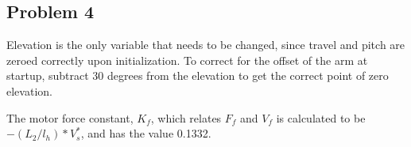 \subsection{Problem 4}
Elevation is the only variable that needs to be changed, since travel
and pitch are zeroed correctly upon initialization. To correct for the
offset of the arm at startup, subtract 30 degrees from the elevation
to get the correct point of zero elevation.


The motor force constant, $K_f$, which relates $F_f$ and $V_f$ is
calculated to be $-(L_2/l_h)*V^*_s$, and has the value 0.1332.


